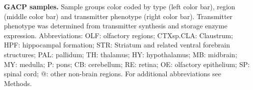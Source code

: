 \textbf{GACP samples.} Sample groups color coded by type (left color bar), region (middle color bar) and transmitter phenotype (right color bar). Transmitter phenotype was determined from transmitter synthesis and storage enzyme expression. Abbreviations: OLF: olfactory regions; CTXsp.CLA: Claustrum; HPF: hippocampal formation; STR: Striatum and related ventral forebrain structures; PAL: pallidum; TH: thalamus; HY: hypothalamus; MB: midbrain; MY: medulla; P: pons; CB: cerebellum; RE: retina; OE: olfactory epithelium; SP: spinal cord; @: other non-brain regions. For additional abbreviations see Methods.